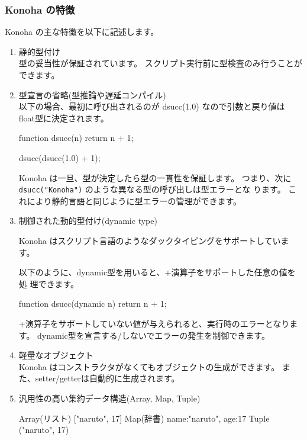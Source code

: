 \documentclass[mingoth,a4paper]{jsarticle}
\begin{document}
\subsubsection{Konoha の特徴}
Konoha の主な特徴を以下に記述します。
\begin{enumerate}
\item 静的型付け\\
型の妥当性が保証されています。
スクリプト実行前に型検査のみ行うことができます。

\item 型宣言の省略(型推論や遅延コンパイル)\\
以下の場合、最初に呼び出されるのが dsucc(1.0) なので引数と戻り値は
float型に決定されます。

\begin{commandline}
function dsucc(n) {
  return n + 1;
}

dsucc(dsucc(1.0) + 1);
\end{commandline}

Konoha は一旦、型が決定したら型の一貫性を保証します。
つまり、次に \verb!dsucc("Konoha")! のような異なる型の呼び出しは型エラーとな
ります。
これにより静的言語と同じように型エラーの管理ができます。

\item 制御された動的型付け(dynamic type)

Konoha はスクリプト言語のようなダックタイピングをサポートしています。

以下のように、dynamic型を用いると、+演算子をサポートした任意の値を処
理できます。

\begin{commandline}
function dsucc(dynamic n) {
  return n + 1;
}
\end{commandline}

+演算子をサポートしていない値が与えられると、実行時のエラーとなります。
dynamic型を宣言する/しないでエラーの発生を制御できます。

\item 軽量なオブジェクト\\
Konoha はコンストラクタがなくてもオブジェクトの生成ができます。
また、setter/getterは自動的に生成されます。

\item 汎用性の高い集約データ構造(Array, Map, Tuple)\\

\begin{commandline}
  Array(リスト)   ["naruto", 17]
  Map(辞書)       {name:"naruto", age:17}
  Tuple          ("naruto", 17)
\end{commandline}


\end{enumerate}
\end{document}
